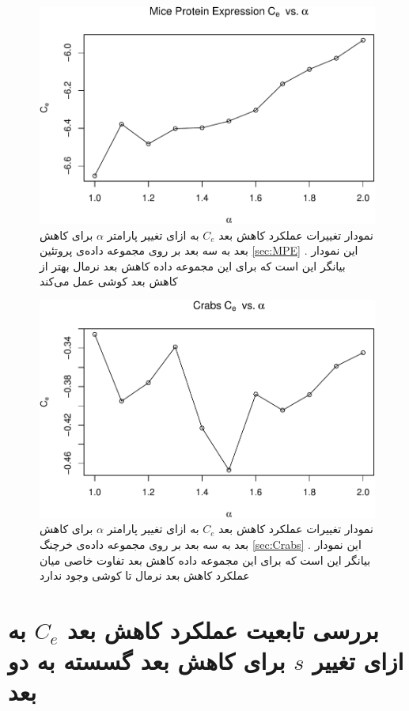 \begin{figure}[H]
\centering
\includegraphics[width=0.7\linewidth]{Report_files/figure-latex/unnamed-chunk-22-6}
\caption{
نمودار تغییرات عملکرد کاهش بعد 
$C_e$
به ازای تغییر پارامتر
$\alpha$
برای کاهش بعد به 
سه بعد بر روی مجموعه داده‌‌‌ی 
پروتئین
\ref{sec:MPE}
. این نمودار بیانگر این است که برای این مجموعه داده کاهش بعد 
نرمال
بهتر از کاهش بعد 
کوشی 
عمل می‌کند
}
\end{figure}

\begin{figure}[H]
\centering
\includegraphics[width=0.7\linewidth]{Report_files/figure-latex/unnamed-chunk-22-7}
\caption{
نمودار تغییرات عملکرد کاهش بعد 
$C_e$
به ازای تغییر پارامتر
$\alpha$
برای کاهش بعد به 
سه بعد بر روی مجموعه داده‌‌‌ی 
خرچنگ
\ref{sec:Crabs}
. این نمودار بیانگر این است که برای این مجموعه داده کاهش بعد 
تفاوت خاصی میان عملکرد کاهش بعد نرمال تا کوشی وجود ندارد
}
\end{figure}

\section{
بررسی تابعیت عملکرد کاهش بعد $C_e$ به ازای تغییر $s$ برای کاهش بعد گسسته به دو بعد
}


